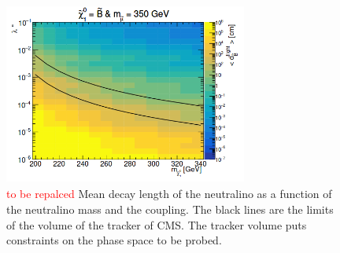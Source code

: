 \documentclass{cernatlasnote}
\begin{document}
\begin{figure}[ht]
\centering
\includegraphics[height=6cm, width=8cm, trim= 0cm 0cm 0cm 0.cm,clip]{images/PhaseSPace/Meandecaylength.png}
\caption{\label{fig:bgctau} \textcolor{red}{to be repalced} Mean decay length of the neutralino as a function of the neutralino mass and the coupling. The black lines are the limits of the volume of the tracker of CMS. The tracker volume puts constraints on the phase space to be probed.}
\end{figure}


\FloatBarrier
\end{document}
